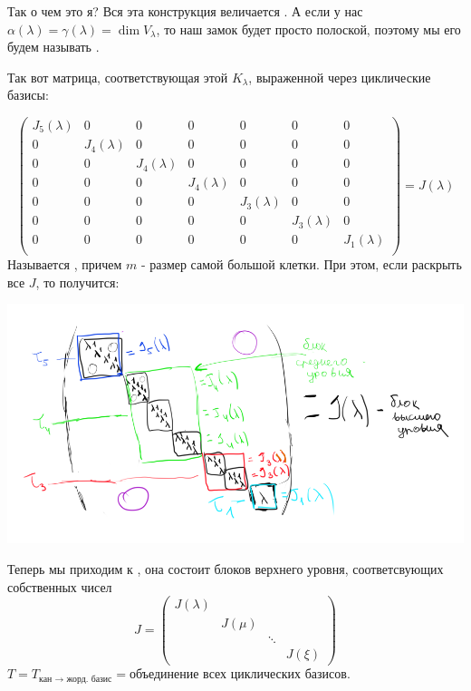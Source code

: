 Так о чем это я? Вся эта конструкция величается . А если у нас $\alpha(\lambda)=\gamma(\lambda)=\dim V_\lambda$, то наш замок будет просто полоской, поэтому мы его будем называть .

Так вот матрица, соответствующая этой $K_\lambda$, выраженной через циклические базисы:

$$
\begin{pmatrix}
    J_5(\lambda) & 0 & 0 & 0 & 0 & 0 & 0\\
    0 & J_4(\lambda)& 0 & 0 & 0 & 0 & 0\\
   0 & 0 & J_4(\lambda) & 0  & 0 & 0 & 0\\
    0 & 0 & 0 & J_4(\lambda)  & 0 & 0 & 0\\
     0 & 0 & 0 & 0  & J_3(\lambda)& 0 & 0\\
      0 & 0 & 0 & 0  & 0 & J_3(\lambda) & 0\\
     0 & 0 & 0 & 0  & 0 & 0 & J_1(\lambda)\\
\end{pmatrix}=J(\lambda)
$$
Называется , причем $m$ - размер самой большой клетки. При этом, если раскрыть все $J$, то получится: 
\begin{center}
   \includegraphics[width = 20cm]{assets/7_9-zhordan-high-matrix.png}
\end{center}


Теперь мы приходим к , она состоит блоков верхнего уровня, соответсвующих собственных чисел
$$J = \begin{pmatrix}
    J(\lambda) & & & \\
    & J(\mu) & & \\
    & & \ddots & \\
    & & &  J(\xi)
\end{pmatrix}$$
$T = T_{\text{кан $\rightarrow$ жорд. базис}} = \text{объединение всех циклических базисов}$. 

